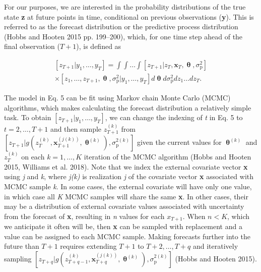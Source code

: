 \documentclass[12pt,]{article}
\begin{document}
For our purposes, we are interested in the probability distributions of
the true state \textbf{z} at future points in time, conditional on
previous observations (\textbf{y}). This is referred to as the forecast
distribution or the predictive process distribution (Hobbs and Hooten
2015 pp. 199--200), which, for one time step ahead of the final
observation (\(T+1\)), is defined as

\begin{equation}
\begin{gathered}
\left[z_{T+1} | y_1,\dots,y_T \right] = \int \int \dots \int \left[z_{T+1} | z_T, \textbf{x}_T, \bm{\uptheta}, \sigma^2_{\text{p}} \right] \\ \times \left[z_1,\dots,z_{T+1},\bm{\uptheta}, \sigma^2_{\text{p}} | y_1,\dots,y_T \right] d\bm{\uptheta} d\sigma^2_{\text{p}} dz_1 \dots dz_T.
\end{gathered}
\end{equation}

The model in Eq. 5 can be fit using Markov chain Monte Carlo (MCMC)
algorithms, which makes calculating the forecast distribution a
relatively simple task. To obtain
\(\left[z_{T+1} | y_1,\dots,y_T \right]\), we can change the indexing of
\emph{t} in Eq. 5 to \(t = 2,\dots,T+1\) and then sample
\(z_{T+1}^{(k)}\) from
\(\left[z_{T+1} | g(z_T^{(k)}, \textbf{x}_{T+1}^{(j(k))}, \bm{\uptheta}^{(k)}), \sigma^{2(k)}_{\text{p}} \right]\)
given the current values for \(\bm{\uptheta}^{(k)}\) and \(z_{T}^{(k)}\)
on each \(k = 1,\dots,K\) iteration of the MCMC algorithm (Hobbs and
Hooten 2015, Williams et al. 2018). Note that we index the external
covariate vector \textbf{x} using \emph{j} and \emph{k}, where
\emph{j(k)} is realization \emph{j} of the covariate vector \textbf{x}
associated with MCMC sample \emph{k}. In some cases, the external
covariate will have only one value, in which case all \emph{K} MCMC
samples will share the same \textbf{x}. In other cases, their may be a
distribution of external covariate values associated with uncertainty
from the forecast of \textbf{x}, resulting in \emph{n} values for each
\(x_{T+1}\). When \(n < K\), which we anticipate it often will be, then
\textbf{x} can be sampled with replacement and a value can be assigned
to each MCMC sample. Making forecasts further into the future than
\(T+1\) requires extending \(T+1\) to \(T+2,\dots,T+q\) and iteratively
sampling
\(\left[z_{T+q} | g(z_{T+q-1}^{(k)}, \textbf{x}_{T+q}^{(j(k))},\bm{\uptheta}^{(k)}), \sigma^{2(k)}_{\text{p}} \right]\)
(Hobbs and Hooten 2015).
\end{document}
